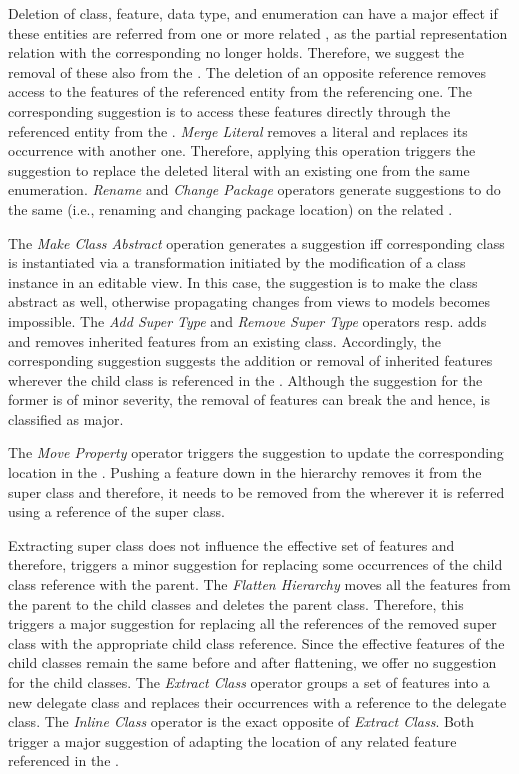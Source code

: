 Deletion of class, feature, data type, and enumeration can have a major effect if these entities are referred from one or more related \viewtypes, as the partial representation relation with the corresponding \metamodel no longer holds. Therefore, we suggest the removal of these also from the \viewtypes. The deletion of an opposite reference removes access to the features of the referenced entity from the referencing one. The corresponding suggestion is to access these features directly through the referenced entity from the \viewtype. \textit{Merge Literal} removes a literal and replaces its occurrence with another one. Therefore, applying this operation triggers the suggestion to replace the deleted literal with an existing one from the same enumeration. \textit{Rename} and \textit{Change Package} operators generate suggestions to do the same (i.e., renaming and changing package location) on the related \viewtypes.

The \textit{Make Class Abstract} operation generates a suggestion iff corresponding \metamodel class is instantiated via a transformation initiated by the modification of a class instance in an editable view. In this case, the suggestion is to make the \viewtype class abstract as well, otherwise propagating changes from views to models becomes impossible. The \textit{Add Super Type} and \textit{Remove Super Type} operators resp. adds and removes inherited features from an existing class. Accordingly, the corresponding suggestion suggests the addition or removal of inherited features wherever the child class is referenced in the \viewtype. Although the suggestion for the former is of minor severity, the removal of features can break the \viewtype and hence, is classified as major.

The \textit{Move Property} operator triggers the suggestion to update the corresponding location in the \viewtype. Pushing a feature down in the hierarchy removes it from the super class and therefore, it needs to be removed from the \viewtype wherever it is referred using a reference of the super class.

Extracting super class does not influence the effective set of features and therefore, triggers a minor suggestion for replacing some occurrences of the child class reference with the parent. The \textit{Flatten Hierarchy} moves all the features from the parent to the child classes and deletes the parent class. Therefore, this triggers a major suggestion for replacing all the references of the removed super class with the appropriate child class reference. Since the effective features of the child classes remain the same before and after flattening, we offer no suggestion for the child classes. The \textit{Extract Class} operator groups a set of features into a new delegate class and replaces their occurrences with a reference to the delegate class. The \textit{Inline Class} operator is the exact opposite of \textit{Extract Class}. Both trigger a major suggestion of adapting the location of any related feature referenced in the \viewtype.

